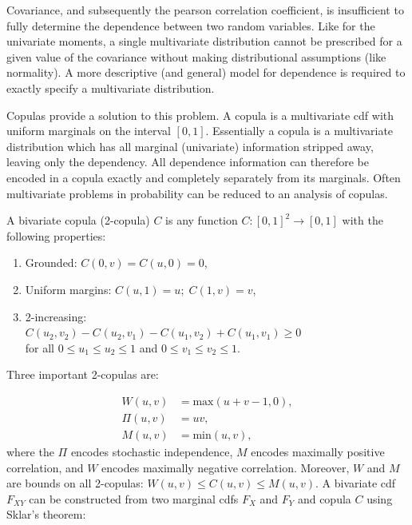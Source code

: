 \documentclass{juliacon}
\begin{document}
Covariance, and subsequently the pearson correlation coefficient, is insufficient to fully determine the dependence between two random variables. Like for the univariate moments, a single multivariate distribution cannot be prescribed for a given value of the covariance without making distributional assumptions (like normality). A more descriptive (and general) model for dependence is required to exactly specify a multivariate distribution.

Copulas \cite{nelsen2007introduction} provide a solution to this problem. A copula is a multivariate cdf with uniform marginals on the interval $[0, 1]$. Essentially a copula is a multivariate distribution which has all marginal (univariate) information stripped away, leaving only the dependency. All dependence information can therefore be encoded in a copula exactly and completely separately from its marginals. Often multivariate problems in probability can be reduced to an analysis of copulas.

A bivariate copula (2-copula) $C$ is any function $C:[0,1]^2 \rightarrow [0,  1]$ with the following properties:

\begin{enumerate}
  \item Grounded: $C(0,v) = C(u,0) = 0$,
  \item Uniform margins: $C(u,1) = u; \;C(1,v) = v$,
  \item 2-increasing: \\ $C(u_{2},v_{2}) - C_{}(u_{2}, v_{1}) - C(u_{1}, v_{2}) + C(u_{1}, v_{1}) \ge 0$\\ for all $0 \le u_{1} \le u_{2} \le 1$ and $0 \le v_{1} \le v_{2} \le 1$.
\end{enumerate}

Three important 2-copulas are:

\begin{align*}
  W(u,v) &= \mathrm{max}( u + v-1,0),  \\
  \Pi(u,v) &= uv, \\
  M(u,v) &= \mathrm{min}(u,v),
\end{align*}
where the $\Pi$ encodes stochastic independence, $M$ encodes maximally positive correlation, and $W$ encodes maximally negative correlation. Moreover, $W$ and $M$ are bounds on all 2-copulas: $W(u,v) \leq C(u,v) \leq M(u,v)$. A bivariate cdf $F_{XY}$ can be constructed from two marginal cdfs $F_{X}$ and $F_{Y}$ and copula $C$ using Sklar's theorem:
\end{document}
